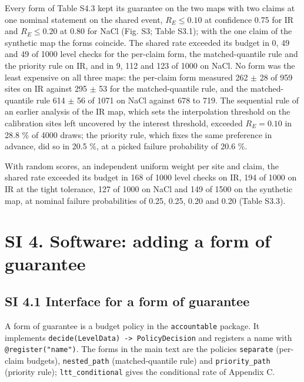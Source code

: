 \documentclass{iopjournal}
\begin{document}
Every form of Table S4.3 kept its guarantee on the two maps with two claims at one nominal statement on the shared event, \(R_E \le 0.10\) at confidence 0.75 for IR and \(R_E \le 0.20\) at 0.80 for NaCl (Fig. S3; Table S3.1); with the one claim of the synthetic map the forms coincide. The shared rate exceeded its budget in 0, 49 and 49 of 1000 level checks for the per-claim form, the matched-quantile rule and the priority rule on IR, and in 9, 112 and 123 of 1000 on NaCl. No form was the least expensive on all three maps: the per-claim form measured 262 \ensuremath{\pm} 28 of 959 sites on IR against 295 \ensuremath{\pm} 53 for the matched-quantile rule, and the matched-quantile rule 614 \ensuremath{\pm} 56 of 1071 on NaCl against 678 to 719. The sequential rule of an earlier analysis of the IR map, which sets the interpolation threshold on the calibration sites left uncovered by the interest threshold, exceeded \(R_E = 0.10\) in 28.8 \% of 4000 draws; the priority rule, which fixes the same preference in advance, did so in 20.5 \%, at a picked failure probability of 20.6 \%.

With random scores, an independent uniform weight per site and claim, the shared rate exceeded its budget in 168 of 1000 level checks on IR, 194 of 1000 on IR at the tight tolerance, 127 of 1000 on NaCl and 149 of 1500 on the synthetic map, at nominal failure probabilities of 0.25, 0.25, 0.20 and 0.20 (Table S3.3).

\hypertarget{si-4.-software-adding-a-form-of-guarantee}{%
\section*{SI 4. Software: adding a form of guarantee}\label{si-4.-software-adding-a-form-of-guarantee}}

\hypertarget{si-4.1-interface-for-a-form-of-guarantee}{%
\subsection*{SI 4.1 Interface for a form of guarantee}\label{si-4.1-interface-for-a-form-of-guarantee}}

A form of guarantee is a budget policy in the \texttt{accountable} package. It implements \texttt{decide(LevelData)\ -\textgreater{}\ PolicyDecision} and registers a name with \texttt{@register("name")}. The forms in the main text are the policies \texttt{separate} (per-claim budgets), \texttt{nested\_path} (matched-quantile rule) and \texttt{priority\_path} (priority rule); \texttt{ltt\_conditional} gives the conditional rate of Appendix C.
\end{document}
